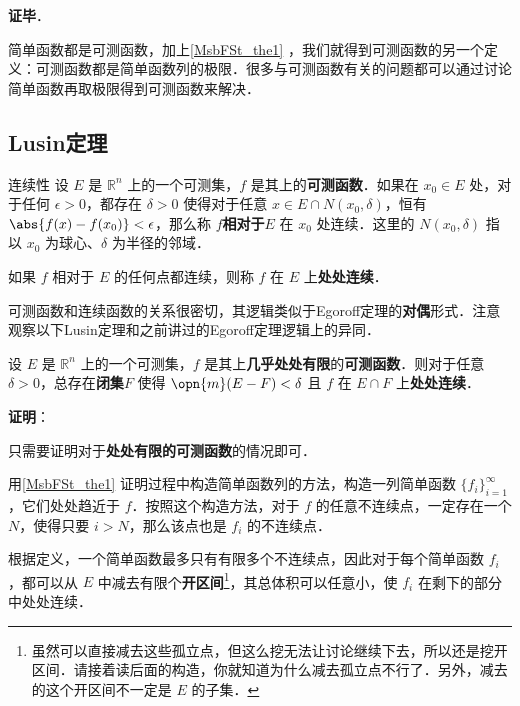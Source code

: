 \textbf{证毕}．

简单函数都是可测函数，加上\autoref{MsbFSt_the1} ，我们就得到可测函数的另一个定义：可测函数都是简单函数列的极限．很多与可测函数有关的问题都可以通过讨论简单函数再取极限得到可测函数来解决．



\subsection{Lusin定理}

\begin{definition}{连续性}\label{MsbFSt_def2}
设 $E$ 是 $\mathbb{R}^n$ 上的一个可测集，$f$ 是其上的\textbf{可测函数}．如果在 $x_0\in E$ 处，对于任何 $\epsilon>0$，都存在 $\delta>0$ 使得对于任意 $x\in E\cap N(x_0, \delta)$，恒有 $\abs{f(x)-f(x_0)}<\epsilon$，那么称 $f$\textbf{相对于}$E$ 在 $x_0$ 处连续．这里的 $N(x_0, \delta)$ 指以 $x_0$ 为球心、$\delta$ 为半径的邻域．

如果 $f$ 相对于 $E$ 的任何点都连续，则称 $f$ 在 $E$ 上\textbf{处处连续}．
\end{definition}

可测函数和连续函数的关系很密切，其逻辑类似于Egoroff定理的\textbf{对偶}形式．注意观察以下Lusin定理和之前讲过的Egoroff定理逻辑上的异同．

\begin{theorem}{}\label{MsbFSt_the2}

设 $E$ 是 $\mathbb{R}^n$ 上的一个可测集，$f$ 是其上\textbf{几乎处处有限}的\textbf{可测函数}．则对于任意 $\delta>0$，总存在\textbf{闭集}$F$ 使得 $\opn{m}(E-F)<\delta$ 且 $f$ 在 $E\cap F$ 上\textbf{处处连续}．

\end{theorem}

\textbf{证明}：

只需要证明对于\textbf{处处有限的可测函数}的情况即可．

用\autoref{MsbFSt_the1}  证明过程中构造简单函数列的方法，构造一列简单函数 $\{f_i\}_{i=1}^\infty$，它们处处趋近于 $f$．按照这个构造方法，对于 $f$ 的任意不连续点，一定存在一个 $N$，使得只要 $i>N$，那么该点也是 $f_i$ 的不连续点．

根据定义，一个简单函数最多只有有限多个不连续点，因此对于每个简单函数 $f_i$，都可以从 $E$ 中减去有限个\textbf{开区间}\footnote{虽然可以直接减去这些孤立点，但这么挖无法让讨论继续下去，所以还是挖开区间．请接着读后面的构造，你就知道为什么减去孤立点不行了．另外，减去的这个开区间不一定是 $E$ 的子集．}，其总体积可以任意小，使 $f_i$ 在剩下的部分中处处连续．

